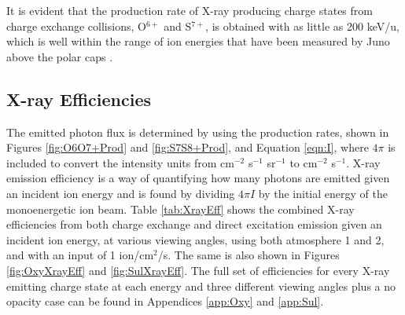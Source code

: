 \documentclass[draft]{agujournal2018}
\begin{document}
It is evident that the production rate of X-ray producing charge states from charge exchange collisions, O$^{6+}$ and S$^{7+}$, is obtained with as little as 200 keV/u, which is well within the range of ion energies that have been measured by Juno above the polar caps \citep{haggerty2017,clark2017a,clark2017b}.

\subsection{X-ray Efficiencies}

The emitted photon flux is determined by using the production rates, shown in Figures \ref{fig:O6O7+Prod} and \ref{fig:S7S8+Prod}, and Equation \ref{eqn:I}, where $4\pi$ is included to convert the intensity units from cm$^{-2}$ s$^{-1}$ sr$^{-1}$ to cm$^{-2}$ s$^{-1}$.
X-ray emission efficiency is a way of quantifying how many photons are emitted given an incident ion energy and is found by dividing $4\pi I$ by the initial energy of the monoenergetic ion beam.
Table \ref{tab:XrayEff} shows the combined X-ray efficiencies from both charge exchange and direct excitation emission given an incident ion energy, at various viewing angles, using both atmosphere 1 and 2, and with an input of 1 ion/cm$^2$/s.
The same is also shown in Figures \ref{fig:OxyXrayEff} and \ref{fig:SulXrayEff}.
The full set of efficiencies for every X-ray emitting charge state at each energy and three different viewing angles plus a no opacity case can be found in Appendices \ref{app:Oxy} and \ref{app:Sul}.
\end{document}
